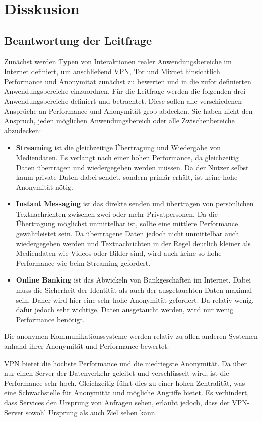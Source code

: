 \section{Disskusion}

\subsection{Beantwortung der Leitfrage}

Zunächst werden Typen von Interaktionen realer Anwendungsbereiche im Internet definiert, um anschließend VPN, Tor und Mixnet hinsichtlich Performance und Anonymität zunächst zu bewerten und in die zufor definierten Anwendungsbereiche einzuordnen.
Für die Leitfrage werden die folgenden drei Anwendungsbereiche definiert und betrachtet. Diese sollen alle verschiedenen Ansprüche an Performance und Anonymität grob abdecken. Sie haben nicht den Anspruch, jeden möglichen Anwendungsbereich oder alle Zwischenbereiche abzudecken:

\begin{itemize}
    \item \textbf{Streaming} ist die gleichzeitige Übertragung und Wiedergabe von Mediendaten. Es verlangt nach einer hohen Performance, da gleichzeitig Daten übertragen und wiedergegeben werden müssen. Da der Nutzer selbst kaum private Daten dabei sendet, sondern primär erhält, ist keine hohe Anonymität nötig.
    \item \textbf{Instant Messaging} ist das direkte senden und übertragen von persönlichen Textnachrichten zwischen zwei oder mehr Privatpersonen. Da die Übertragung möglichst unmittelbar ist, sollte eine mittlere Performance gewährleistet sein. Da übertragene Daten jedoch nicht unmittelbar auch wiedergegeben werden und Textnachrichten in der Regel deutlich kleiner als Mediendaten wie Videos oder Bilder sind, wird auch keine so hohe Performance wie beim Streaming gefordert.
    \item \textbf{Online Banking} ist das Abwickeln von Bankgeschäften im Internet. Dabei muss die Sicherheit der Identität als auch der ausgetauchten Daten maximal sein. Daher wird hier eine sehr hohe Anonymität gefordert. Da relativ wenig, dafür jedoch sehr wichtige, Daten ausgetaucht werden, wird nur wenig Performance benötigt.
\end{itemize}

Die anonymen Kommunikationssysteme werden relativ zu allen anderen Systemen anhand ihrer Anonymität und Performance bewertet.

VPN bietet die höchste Performance und die niedriegste Anonymität. Da über nur einen Server der Datenverkehr geleitet und verschlüsselt wird, ist die Performance sehr hoch. Gleichzeitig führt dies zu einer hohen Zentralität, was eine Schwachstelle für Anonymität und mögliche Angriffe bietet. Es verhindert, dass Services den Ursprung von Anfragen sehen, erlaubt jedoch, dass der VPN-Server sowohl Ursprung als auch Ziel sehen kann.


